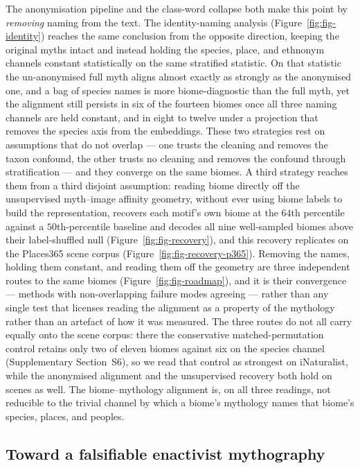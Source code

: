 \documentclass[11pt,a4paper]{article}
\begin{document}
The anonymisation pipeline and the class-word collapse both make
this point by \emph{removing} naming from the text. The
identity-naming analysis (Figure~\ref{fig:fig-identity}) reaches
the same conclusion from the opposite direction, keeping the
original myths intact and instead holding the species, place, and
ethnonym channels constant statistically on the same stratified
statistic. On that statistic the un-anonymised full myth aligns
almost exactly as strongly as the anonymised one, and a bag of
species names is more biome-diagnostic than the full myth, yet the
alignment still persists in six of the fourteen biomes once all
three naming channels are held constant, and in eight to twelve
under a projection that removes the species axis from the
embeddings. These two strategies rest on assumptions that do not
overlap --- one trusts the cleaning and removes the taxon confound,
the other trusts no cleaning and removes the confound through
stratification --- and they converge on the same biomes. A third
strategy reaches them from a third disjoint assumption: reading
biome directly off the unsupervised myth--image affinity geometry,
without ever using biome labels to build the representation,
recovers each motif's own biome at the $64$th percentile against a
$50$th-percentile baseline and decodes all nine well-sampled biomes
above their label-shuffled null (Figure~\ref{fig:fig-recovery}), and
this recovery replicates on the Places365 scene corpus
(Figure~\ref{fig:fig-recovery-p365}). Removing the names, holding
them constant, and reading them off the geometry are three
independent routes to the same biomes (Figure~\ref{fig:fig-roadmap}),
and it is their convergence --- methods with non-overlapping failure
modes agreeing --- rather than any single test that licenses reading
the alignment as a property of the mythology rather than an artefact
of how it was measured. The three routes do not all carry equally
onto the scene corpus: there the conservative matched-permutation
control retains only two of eleven biomes against six on the species
channel (Supplementary Section~S6), so we read
that control as strongest on iNaturalist, while the anonymised
alignment and the unsupervised recovery both hold on scenes as well.
The biome--mythology alignment is, on all three readings, not
reducible to the trivial channel by which a biome's mythology names
that biome's species, places, and peoples.

\subsection*{Toward a falsifiable enactivist mythography}
\end{document}
